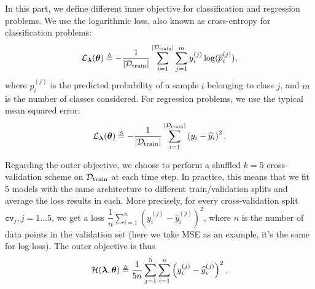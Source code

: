 \documentclass[twoside,11pt]{article}
\begin{document}
%

In this part, we define different inner objective for classification and regression problems. We use the logarithmic loss, also known as cross-entropy for classification problems:
\[
\mathcal{L}_{{\boldsymbol \lambda}}({\boldsymbol \theta}) \triangleq - \frac{1}{|\mathcal{D}_{\operatorname{train}}|} \sum_{i=1}^{|\mathcal{D}_{\operatorname{train}}|} \sum_{j=1}^m y^{(j)}_{i}\log(\widehat{p}^{(j)}_{i}),
\]
where $\hat{p}^{(j)}_{i}$ is the predicted probability of a sample $i$ belonging to class $j$, and $m$ is the number of classes considered. For regression problems, we use the typical mean squared error:
\[
\mathcal{L}_{{\boldsymbol \lambda}}({\boldsymbol \theta}) \triangleq - \frac{1}{|\mathcal{D}_{\operatorname{train}}|} \sum_{i=1}^{|\mathcal{D}_{\operatorname{train}}|} \left(y_i - \widehat{y}_i\right)^2.
\]

Regarding the outer objective, we choose to perform a shuffled $k=5$ cross-validation scheme on $\mathcal{D}_{\operatorname{train}}$ at each time step. In practice, this means that we fit 5 models with the same architecture to different train/validation splits and average the loss results in each. More precisely, for every cross-validation split $\mathtt{cv}_j,j=1\ldots5$, we get a loss $\dfrac{1}{n} \sum^{n}_{i=1} \left(y^{(j)}_{i} - \hat{y}^{(j)}_i\right)^2$, where $n$ is the number of data points in the validation set (here we take MSE as an example, it's the same for log-loss). The outer objective is thus
\[
\mathcal{H}({\boldsymbol \lambda},{\boldsymbol \theta}) \triangleq \frac{1}{5n}\sum_{j=1}^{5} \sum_{i=1}^n \left(y^{(j)}_{i} - \widehat{y}^{(j)}_i\right)^2.
\]
\end{document}
